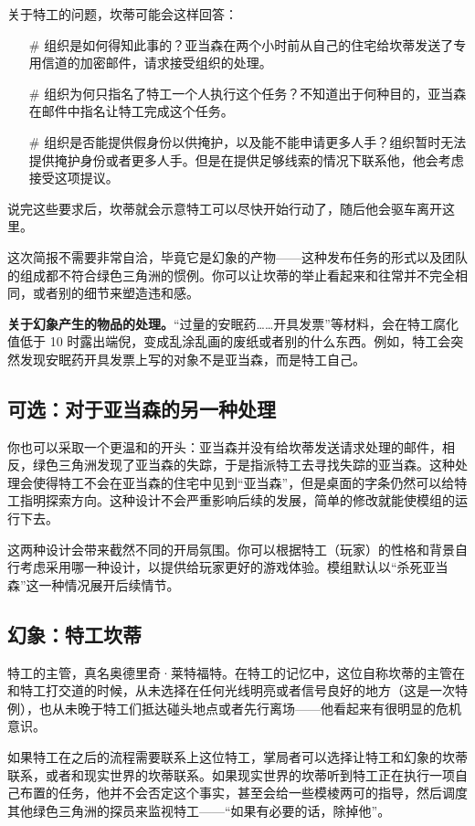 关于特工的问题，坎蒂可能会这样回答：

\begin{itemize}
    \item[\#] 组织是如何得知此事的？亚当森在两个小时前从自己的住宅给坎蒂发送了专用信道的加密邮件，请求接受组织的处理。
    \item[\#] 组织为何只指名了特工一个人执行这个任务？不知道出于何种目的，亚当森在邮件中指名让特工完成这个任务。
    \item[\#] 组织是否能提供假身份以供掩护，以及能不能申请更多人手？组织暂时无法提供掩护身份或者更多人手。但是在提供足够线索的情况下联系他，他会考虑接受这项提议。
\end{itemize}

说完这些要求后，坎蒂就会示意特工可以尽快开始行动了，随后他会驱车离开这里。

这次简报不需要非常自洽，毕竟它是幻象的产物——这种发布任务的形式以及团队的组成都不符合绿色三角洲的惯例。你可以让坎蒂的举止看起来和往常并不完全相同，或者别的细节来塑造违和感。

\textbf{关于幻象产生的物品的处理。}“过量的安眠药……开具发票”等材料，会在特工腐化值低于 10 时露出端倪，变成乱涂乱画的废纸或者别的什么东西。例如，特工会突然发现安眠药开具发票上写的对象不是亚当森，而是特工自己。

\subsection{可选：对于亚当森的另一种处理}

你也可以采取一个更温和的开头：亚当森并没有给坎蒂发送请求处理的邮件，相反，绿色三角洲发现了亚当森的失踪，于是指派特工去寻找失踪的亚当森。这种处理会使得特工不会在亚当森的住宅中见到“亚当森”，但是桌面的字条仍然可以给特工指明探索方向。这种设计不会严重影响后续的发展，简单的修改就能使模组的运行下去。

这两种设计会带来截然不同的开局氛围。你可以根据特工（玩家）的性格和背景自行考虑采用哪一种设计，以提供给玩家更好的游戏体验。模组默认以“杀死亚当森”这一种情况展开后续情节。

\subsection{幻象：特工坎蒂}
特工的主管，真名奥德里奇·莱特福特。在特工的记忆中，这位自称坎蒂的主管在和特工打交道的时候，从未选择在任何光线明亮或者信号良好的地方（这是一次特例），也从未晚于特工们抵达碰头地点或者先行离场——他看起来有很明显的危机意识。

如果特工在之后的流程需要联系上这位特工，掌局者可以选择让特工和幻象的坎蒂联系，或者和现实世界的坎蒂联系。如果现实世界的坎蒂听到特工正在执行一项自己布置的任务，他并不会否定这个事实，甚至会给一些模棱两可的指导，然后调度其他绿色三角洲的探员来监视特工——“如果有必要的话，除掉他”。

